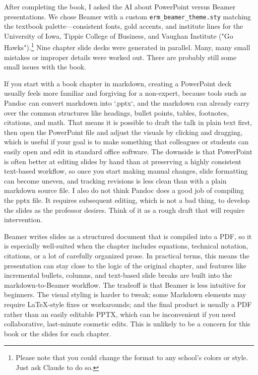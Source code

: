 \documentclass[11pt,letterpaper]{article}
\begin{document}
After completing the book, I asked the AI about PowerPoint versus Beamer presentations. We chose Beamer with a custom \texttt{erm\_beamer\_theme.sty} matching the textbook palette---consistent fonts, gold accents, and institute lines for the University of Iowa, Tippie College of Business, and Vaughan Institute ("Go Hawks").\footnote{Please note that you could change the format to any school's colors or style. Just ask Claude to do so.} Nine chapter slide decks were generated in parallel.  Many, many small mistakes or improper details were worked out. There are probably still some small issues with the book.

If you start with a book chapter in markdown, creating a PowerPoint deck usually feels more familiar and forgiving for a non-expert, because tools such as Pandoc can convert markdown into `.pptx`, and the markdown can already carry over the common structures like headings, bullet points, tables, footnotes, citations, and math. That means it is possible to draft the talk in plain text first, then open the PowerPoint file and adjust the visuals by clicking and dragging, which is useful if your goal is to make something that colleagues or students can easily open and edit in standard office software. The downside is that PowerPoint is often better at editing slides by hand than at preserving a highly consistent text-based workflow, so once you start making manual changes, slide formatting can become uneven, and tracking revisions is less clean than with a plain markdown source file. I also do not think Pandoc does a good job of compiling the pptx file. It requires subsequent editing, which is not a bad thing, to develop the slides as the professor desires. Think of it as a rough draft that will require intervention.

Beamer writes slides as a structured document that is compiled into a PDF, so it is especially well-suited when the chapter includes equations, technical notation, citations, or a lot of carefully organized prose. In practical terms, this means the presentation can stay close to the logic of the original chapter, and features like incremental bullets, columns, and text-based slide breaks are built into the markdown-to-Beamer workflow. The tradeoff is that Beamer is less intuitive for beginners. The visual styling is harder to tweak; some Markdown elements may require LaTeX-style fixes or workarounds; and the final product is usually a PDF rather than an easily editable PPTX, which can be inconvenient if you need collaborative, last-minute cosmetic edits. This is unlikely to be a concern for this book or the slides for each chapter.
\end{document}

